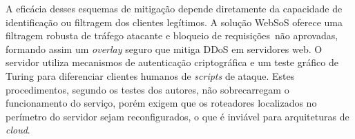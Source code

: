 
A eficácia desses esquemas de mitigação depende diretamente da capacidade de identificação ou filtragem dos clientes legítimos. 
%
A solução WebSoS \cite{Stavrou:2005:WOS:1090583.1648614} %
oferece uma filtragem robusta de tráfego atacante e bloqueio de requisições~não aprovadas, formando assim um \emph{overlay} seguro que mitiga DDoS em servidores web. O servidor utiliza mecanismos de autenticação criptográfica e um teste gráfico de Turing \cite{Dietrich00analyzingdistributed} para diferenciar clientes humanos de \emph{scripts} de ataque. Estes procedimentos, segundo os testes dos autores, não sobrecarregam o funcionamento do serviço, porém exigem que os roteadores localizados no perímetro do servidor sejam reconfigurados, o que é inviável para arquiteturas de \emph{cloud}.
